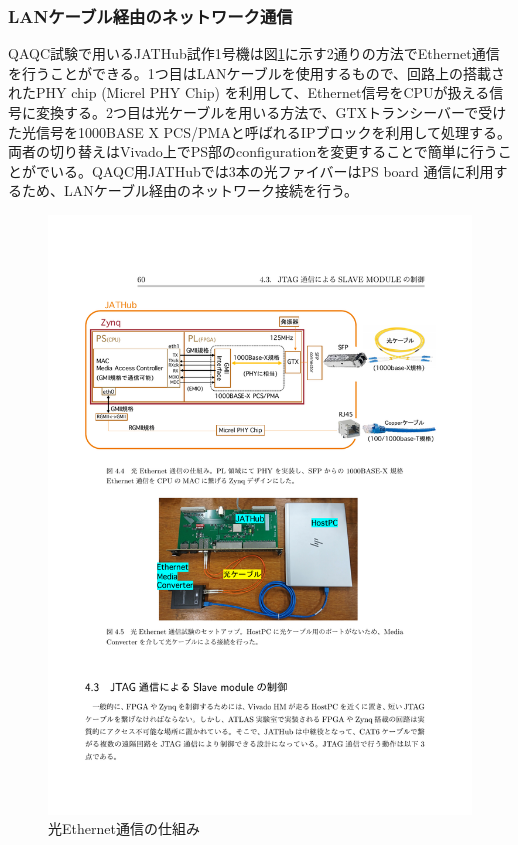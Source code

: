 \subsubsection{LANケーブル経由のネットワーク通信}
\label{subsubsec_network}
\baselineskip
QAQC試験で用いるJATHub試作1号機は図\ref{JATHub_ether}に示す2通りの方法でEthernet通信を行うことができる。1つ目はLANケーブルを使用するもので、回路上の搭載されたPHY chip (Micrel PHY Chip) を利用して、Ethernet信号をCPUが扱える信号に変換する。2つ目は光ケーブルを用いる方法で、GTXトランシーバーで受けた光信号を1000BASE X PCS/PMAと呼ばれるIPブロックを利用して処理する。両者の切り替えはVivado上でPS部のconfigurationを変更することで簡単に行うことがでいる。QAQC用JATHubでは3本の光ファイバーはPS board 通信に利用するため、LANケーブル経由のネットワーク接続を行う。

\begin{figure} 
\centering
\includegraphics[width=16cm]{fig/QAQC/JATHub_ether.pdf}
\caption[光Ethernet通信の仕組み]{光Ethernet通信の仕組み\cite{mt_atanaka}}
\label{JATHub_ether}
\end{figure}


